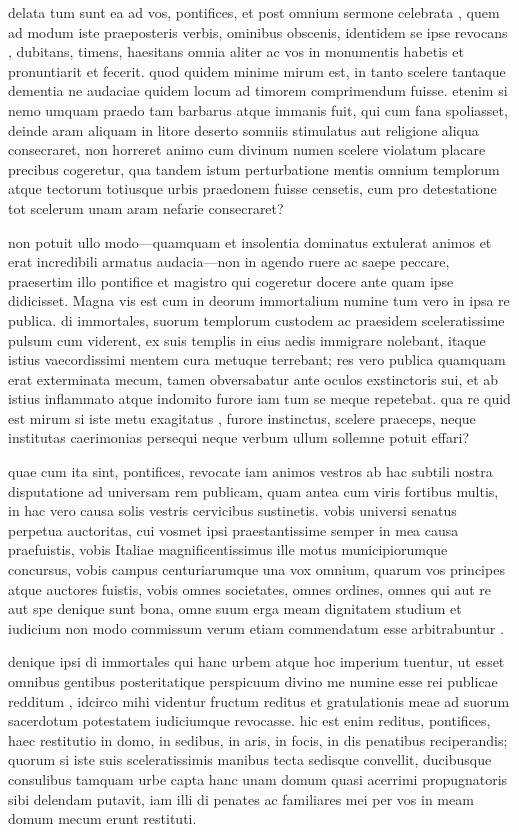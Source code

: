  delata tum sunt ea ad vos, pontifices, et post omnium sermone celebrata , quem ad modum iste praeposteris verbis, ominibus obscenis, identidem se ipse revocans , dubitans, timens, haesitans omnia aliter ac vos in monumentis habetis et pronuntiarit et fecerit. quod quidem minime mirum est, in tanto scelere tantaque dementia ne audaciae quidem locum ad timorem comprimendum fuisse. etenim si nemo umquam praedo tam barbarus atque immanis fuit, qui cum fana spoliasset, deinde aram aliquam in litore deserto somniis stimulatus aut religione aliqua consecraret, non horreret animo cum divinum numen scelere violatum placare precibus cogeretur, qua tandem istum perturbatione mentis omnium templorum atque tectorum totiusque urbis praedonem fuisse censetis, cum pro detestatione tot scelerum unam aram nefarie consecraret?

 non potuit ullo modo—quamquam et insolentia dominatus extulerat animos et erat incredibili armatus audacia—non in agendo ruere ac saepe peccare, praesertim illo pontifice et magistro qui cogeretur docere ante quam ipse didicisset. Magna vis est cum in deorum immortalium numine tum vero in ipsa re publica. di immortales, suorum templorum custodem ac praesidem sceleratissime pulsum cum viderent, ex suis templis in eius aedis immigrare nolebant, itaque istius vaecordissimi mentem cura metuque terrebant; res vero publica quamquam erat exterminata mecum, tamen obversabatur ante oculos exstinctoris sui, et ab istius inflammato atque indomito furore iam tum se meque repetebat. qua re quid est mirum si iste metu exagitatus , furore instinctus, scelere praeceps, neque institutas caerimonias persequi neque verbum ullum sollemne potuit effari?

 quae cum ita sint, pontifices, revocate iam animos vestros ab hac subtili nostra disputatione ad universam rem publicam, quam antea cum viris fortibus multis, in hac vero causa solis vestris cervicibus sustinetis. vobis universi senatus perpetua auctoritas, cui vosmet ipsi praestantissime semper in mea causa praefuistis, vobis Italiae magnificentissimus ille motus municipiorumque concursus, vobis campus centuriarumque una vox omnium, quarum vos principes atque auctores fuistis, vobis omnes societates, omnes ordines, omnes qui aut re aut spe denique sunt bona, omne suum erga meam dignitatem studium et iudicium non modo commissum verum etiam commendatum esse arbitrabuntur .

 denique ipsi di immortales qui hanc urbem atque hoc imperium tuentur, ut esset omnibus gentibus posteritatique perspicuum divino me numine esse rei publicae redditum , idcirco mihi videntur fructum reditus et gratulationis meae ad suorum sacerdotum potestatem iudiciumque revocasse. hic est enim reditus, pontifices, haec restitutio in domo, in sedibus, in aris, in focis, in dis penatibus reciperandis; quorum si iste suis sceleratissimis manibus tecta sedisque convellit, ducibusque consulibus tamquam urbe capta hanc unam domum quasi acerrimi propugnatoris sibi delendam putavit, iam illi di penates ac familiares mei per vos in meam domum mecum erunt restituti.

